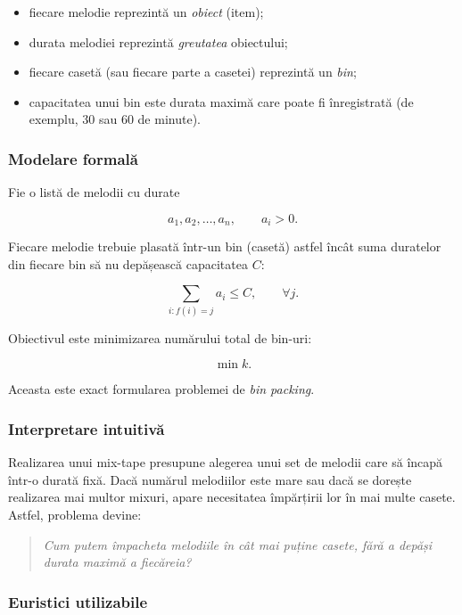 \documentclass[runningheads]{llncs}
\begin{document}
	\begin{itemize}
		\item fiecare melodie reprezintă un \emph{obiect} (item);
		\item durata melodiei reprezintă \emph{greutatea} obiectului;
		\item fiecare casetă (sau fiecare parte a casetei) reprezintă un \emph{bin};
		\item capacitatea unui bin este durata maximă care poate fi înregistrată (de exemplu, 30 sau 60 de minute).
	\end{itemize}

	\subsubsection{Modelare formală}

	Fie o listă de melodii cu durate


	\[
	a_1, a_2, \dots, a_n, \qquad a_i > 0.
	\]



	Fiecare melodie trebuie plasată într-un bin (casetă) astfel încât suma duratelor din fiecare bin să nu depășească capacitatea $C$:


	\[
	\sum_{i : f(i) = j} a_i \le C, \qquad \forall j.
	\]



	Obiectivul este minimizarea numărului total de bin-uri:


	\[
	\min k.
	\]



	Aceasta este exact formularea problemei de \textit{bin packing}.

	\subsubsection{Interpretare intuitivă}

	Realizarea unui mix-tape presupune alegerea unui set de melodii care să încapă într-o durată fixă.
	Dacă numărul melodiilor este mare sau dacă se dorește realizarea mai multor mixuri, apare necesitatea împărțirii lor în mai multe casete.
	Astfel, problema devine:

	\begin{quote}
		\emph{Cum putem împacheta melodiile în cât mai puține casete, fără a depăși durata maximă a fiecăreia?}
	\end{quote}

	\subsubsection{Euristici utilizabile}
\end{document}
